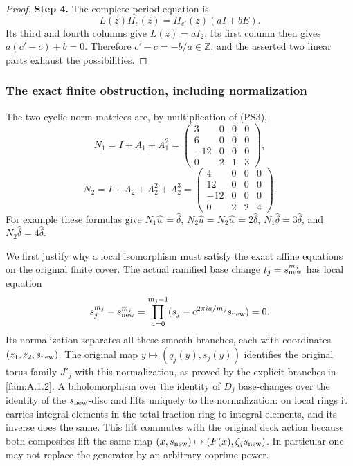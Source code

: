 \documentclass[11pt,a4paper]{article}
\theoremstyle{plain}
\theoremstyle{definition}
\begin{document}
\begin{proof}
\par\smallskip\noindent\textbf{Step 4.} The complete period equation is
\[
                   L(z)\Pi_c(z)=\Pi_{c'}(z)(aI+bE).
 \tag{PS8}\label{pshift:eq:period-morphism}
\]
Its third and fourth columns give $L(z)=aI_2$. Its first column
then gives $a(c'-c)+b=0$. Therefore $c'-c=-b/a\in\mathbb Z$,
and the asserted two linear parts exhaust the possibilities.
\end{proof}

\subsubsection{The exact finite obstruction, including normalization}

The two cyclic norm matrices are, by multiplication of (PS3),
\[
 N_1=I+A_1+A_1^2=
 \begin{pmatrix}3&0&0&0\\6&0&0&0\\-12&0&0&0\\0&2&1&3\end{pmatrix},
\]
\[
 N_2=I+A_2+A_2^2+A_2^3=
 \begin{pmatrix}4&0&0&0\\12&0&0&0\\-12&0&0&0\\0&2&2&4\end{pmatrix}.
 \tag{PS9}\label{pshift:eq:norms}
\]
For example these formulas give
$N_1\widehat w=\widehat\delta$,
$N_2\widehat u=N_2\widehat w=2\widehat\delta$,
$N_1\widehat\delta=3\widehat\delta$, and
$N_2\widehat\delta=4\widehat\delta$.

We first justify why a local isomorphism must satisfy the exact affine
equations on the original finite cover. The actual ramified base change
$t_j=s_{\rm new}^{m_j}$ has local equation
\[
 s_j^{m_j}-s_{\rm new}^{m_j}
   =\prod_{a=0}^{m_j-1}(s_j-e^{2\pi ia/m_j}s_{\rm new})=0.
\]
Its normalization separates all these smooth branches, each with
coordinates $(z_1,z_2,s_{\rm new})$. The original map
$y\mapsto(q_j(y),s_j(y))$ identifies the original torus family $J'_j$
with this normalization, as proved by the explicit branches in
\cref{fam:A.1.2}. A biholomorphism over the identity of
$D_j$ base-changes over the identity of the $s_{\rm new}$-disc and lifts uniquely
to the normalization: on local rings it carries integral elements in
the total fraction ring to integral elements, and its inverse does
the same. This lift commutes with the original deck action because
both composites lift the same map $(x,s_{\rm new})\mapsto(F(x),\zeta_j s_{\rm new})$.
In particular one may not replace the generator by an arbitrary
coprime power.
\end{document}
